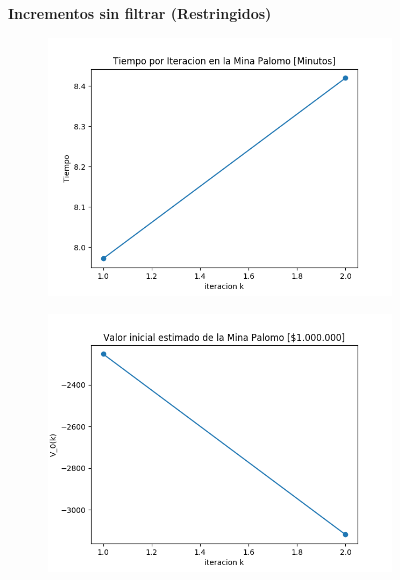 \documentclass[12pt,letterpaper]{article}
\begin{document}
\begin{figure}[H]
  \captionsetup[subfigure]{labelformat=empty}
  \centering
  \textbf{Incrementos sin filtrar (Restringidos)}
  
  \begin{subfigure}[b]{0.4\textwidth}
     \includegraphics[width=\textwidth]{Graficos/sin_filtrar/restringido/palomo25_inc_times.png}
     \caption{}
     \label{fig:ex1}
  \end{subfigure}
  \begin{subfigure}[b]{0.4\textwidth}
     \includegraphics[width=\textwidth]{Graficos/sin_filtrar/restringido/palomo25_inc_v_k.png}
     \caption{}
     \label{fig:ex2}
  \end{subfigure}
\end{figure}
\end{document}
